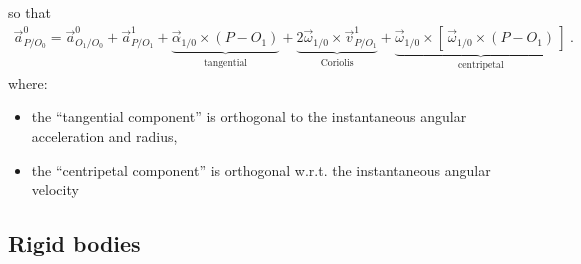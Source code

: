 \documentclass[letterpaper,10pt,english]{jupyterBook}
\begin{document}
\sphinxAtStartPar
so that
\begin{equation}\label{equation:ch/kinematics-relative:eq:relative:point:acc}
\begin{split}
\vec{a}^0_{P/O_0} = \vec{a}^0_{O_1/O_0} + \vec{a}^{1}_{P/O_1} + \underbrace{\vec{\alpha}_{1/0} \times (P - O_1)}_{\text{tangential}} + \underbrace{2 \vec{\omega}_{1/0} \times \vec{v}^1_{P/O_1}}_{\text{Coriolis}} + \underbrace{\vec{\omega}_{1/0} \times [ \, \vec{\omega}_{1/0} \times (P - O_1) \, ]}_{\text{centripetal}} \ .
\end{split}
\end{equation}
\sphinxAtStartPar
where:
\begin{itemize}
\item {} 
\sphinxAtStartPar
the “tangential component” is orthogonal to the instantaneous angular acceleration and radius,

\item {} 
\sphinxAtStartPar
the “centripetal component” is orthogonal w.r.t. the instantaneous angular velocity

\end{itemize}

\sphinxAtStartPar
{}  


\subsection{Rigid bodies}
\label{\detokenize{ch/kinematics-relative:rigid-bodies}}
\sphinxAtStartPar
{}

\sphinxAtStartPar
{}

\sphinxAtStartPar
{}

\sphinxstepscope
\end{document}
